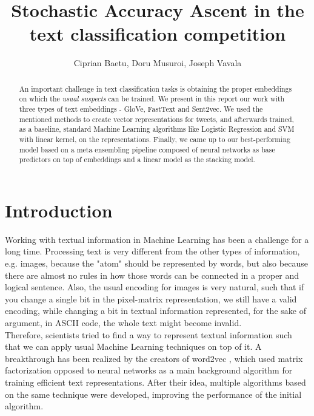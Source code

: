 \documentclass[10pt,conference,compsocconf]{IEEEtran}
\begin{document}
\title{Stochastic Accuracy Ascent in the text classification competition}

\author{
	Ciprian Baetu, Doru Musuroi, Joseph Vavala
}

\maketitle

\begin{abstract}
  An important challenge in text classification tasks is obtaining the proper embeddings
  on which the \textit{usual suspects} can be trained. We present in this report
  our work with three types of text embeddings - GloVe, FastText and Sent2vec. We used the mentioned methods to create vector representations for tweets, and afterwards trained, as a baseline, standard Machine Learning algorithms like Logistic Regression and SVM with linear kernel, on the representations. Finally,  we came up to our best-performing model based on a meta ensembling pipeline composed of neural networks as base predictors on top of embeddings and a linear model as the stacking model.
\end{abstract}

\section{Introduction}

Working with textual information in Machine Learning has been a challenge for a long time. Processing text is very different from the other types of information, e.g. images, because the "atom" should be represented by words, but also because there are almost no rules in how those words can be connected in a proper and logical sentence. Also, the usual encoding for images is very natural, such that if you change a single bit in the pixel-matrix representation, we still have a valid encoding, while changing a bit in textual information represented, for the sake of argument, in ASCII code, the whole text might become invalid. \\

Therefore, scientists tried to find a way to represent textual information such that we can apply usual Machine Learning techniques on top of it. A breakthrough has been realized by the creators of word2vec \cite{MCC13+}, which used matrix factorization opposed to neural networks as a main background algorithm for training efficient text representations. After their idea, multiple algorithms based on the same technique were developed, improving the performance of the initial algorithm.\\
\end{document}
